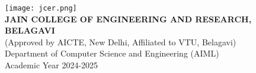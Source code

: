 \documentclass[12pt, a4paper]{article} %
\begin{document}
\begin{titlepage}
\begin{center}
			\vspace{0.2in}
			
			\texttt{[image: jcer.png]}\\
			\vspace{0.1in}
			\textbf{JAIN COLLEGE OF ENGINEERING AND RESEARCH, BELAGAVI}\\
			
			{\small (Approved by AICTE, New Delhi, Affiliated to VTU, Belagavi)}\\
			\vspace{0.1in}
			{\small Department of Computer Science and Engineering (AIML)}\\
			
			\vspace{0.1in}
			{\small Academic Year 2024-2025}\\
			
		\end{center} %
	\end{titlepage} %
	
\end{document}
